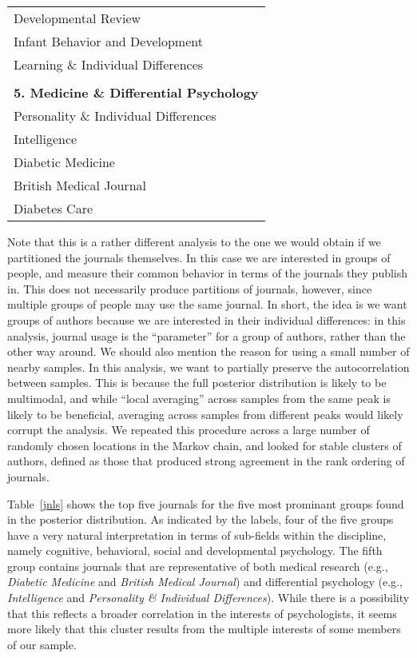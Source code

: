 \documentclass[authoryear]{elsarticle}
\newcommand{\tbsp}{\vspace*{-7pt}}
\begin{document}
\begin{table}[p]
\begin{center}
\begin{tabular}{l}
        Developmental Review  \tbsp  \\
        Infant Behavior and Development   \tbsp \\
        Learning \& Individual Differences   \tbsp  \\
        \\      {\bf 5. Medicine \& Differential Psychology} \\ \hline
        Personality \& Individual Differences   \tbsp \\
        Intelligence    \tbsp  \\
        Diabetic Medicine  \tbsp \\
        British Medical Journal \tbsp  \\
        Diabetes Care   \tbsp \\
        \end{tabular}
        \normalsize
        \vspace*{10pt}
        \end{center}
\end{table}

Note that this is a rather different analysis to the one we would obtain if we
partitioned the journals themselves. In this case we are interested in groups
of people, and measure their common behavior in terms of the journals
they publish in. This does not necessarily produce partitions of journals,
however, since multiple groups of people may use the same journal. In short,
the idea is we want groups of authors because we are interested in their individual
differences: in this analysis, journal usage is the ``parameter'' for a group of
authors, rather than the other way around. We should also mention the reason
for using a small number of nearby samples. In this analysis, we want to
partially preserve the autocorrelation between samples. This is because the
full posterior distribution is likely to be multimodal, and while ``local averaging''
across samples from the same peak is likely to be beneficial, averaging across
samples from different peaks would likely corrupt the analysis. We repeated
this procedure across a large number of randomly chosen locations in the
Markov chain, and looked for stable clusters of authors, defined as those
that produced strong agreement in the rank ordering of journals.

Table~\ref{jnls} shows the top five journals for the five most prominant
groups found in the posterior distribution. As indicated by the labels,
four of the five groups have a very natural interpretation in terms of sub-fields
within the discipline, namely cognitive, behavioral, social and developmental
psychology. The fifth group contains journals that are representative
of both medical research  (e.g., {\it Diabetic Medicine} and {\it British
Medical Journal}) and differential psychology (e.g., {\it Intelligence} and
{\it Personality \& Individual Differences}). While there is a possibility
that this reflects a broader correlation in the interests of psychologists, it
seems more likely that this cluster  results from the multiple interests of
some members of our sample.
\end{document}
